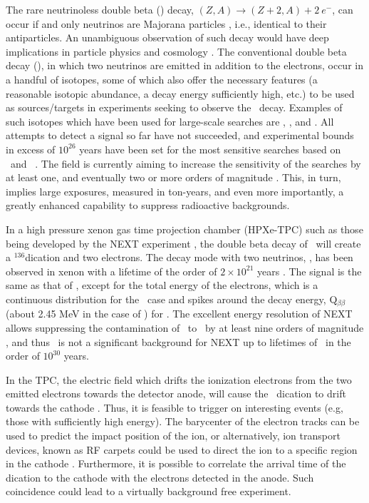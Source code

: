 \documentclass[aps,prl,reprint,longbibliography,superscriptaddress, english]{revtex4-1}
\begin{document}
The rare neutrinoless double beta  (\bbonu) decay, $(Z,A) \rightarrow (Z+2,A) + 2\ e^{-}$, can occur if and only neutrinos are Majorana particles \cite{Majorana:1937}, i.e., identical to their antiparticles. An unambiguous observation of such decay would have deep implications in particle physics and cosmology \cite{Sakharov1967,Fukugita:1986hr,GellMann:1980vs,Yanagida:1979as,Mohapatra:1979ia}. 
The conventional double beta decay (\bbtnu), in which two neutrinos are emitted in addition to the electrons, occur in a handful of isotopes, some of which also offer the necessary features (a reasonable isotopic abundance, a decay energy sufficiently high, etc.) to be used as sources/targets in experiments seeking to observe the \bbonu\ decay. Examples of such isotopes which have been used for large-scale searches are \GE, \TE, and \XE. All attempts to detect a signal so far have not succeeded, and experimental bounds in excess of $10^{26}$ years have been set for the most sensitive searches based on \XE\ and \GE\ \cite{Gando:2016ji, Agostini:2018tnm}.
The field is currently aiming to increase the sensitivity of the searches by at least one, and eventually two or more orders of magnitude \cite{Gomez-Cadenas:2019sfa}. This, in turn, implies large exposures, measured in ton-years, and even more importantly, a greatly enhanced capability to suppress radioactive backgrounds. 

In a high pressure xenon gas time projection chamber (HPXe-TPC) such as those being developed by the NEXT experiment \cite{Martin-Albo:2015rhw, NEXT:2020amj}, the double beta decay of \XE\ will create a $^{136}$\Bapp dication and two electrons.
The decay mode with two neutrinos, \bbtnu, has been observed in xenon with a lifetime of the order of $2 \times 10^{21}$ years \cite{Ackerman:2011gz}. The  signal is the same as that of \bbonu, except for the total energy of the electrons, which is a continuous distribution for the \bbtnu\ case and spikes around the decay energy, Q$_{\beta\beta}$ (about 2.45 MeV in the case of \XE) for \cite{rivilla_fluorescent_2020}. The excellent energy resolution of NEXT allows suppressing the contamination of \bbtnu\ to \bbonu\ by at least nine orders of magnitude \cite{ALVAREZ2013101,Renner:2019pfe,rivilla_fluorescent_2020}, and thus \bbtnu\ is not a significant background for NEXT up to lifetimes of \bbonu\ in the order of $10^{30}$ years. 

In the TPC, the electric field which drifts the ionization electrons from the two emitted electrons towards the detector anode, will cause the \Bapp\ dication to drift towards the cathode \cite{Bainglass:2018odn}. Thus, it is feasible to trigger on interesting events (e.g, those with sufficiently high energy). The barycenter of the electron tracks can be used to predict the impact position of the ion, or alternatively, ion transport devices, known as RF carpets could be used to direct the ion to a specific region in the cathode \cite{NEXT:2021idl}. Furthermore, it is possible to correlate the arrival time of the dication to the cathode with the electrons detected in the anode. Such coincidence could lead to a virtually background free experiment. 
\end{document}
